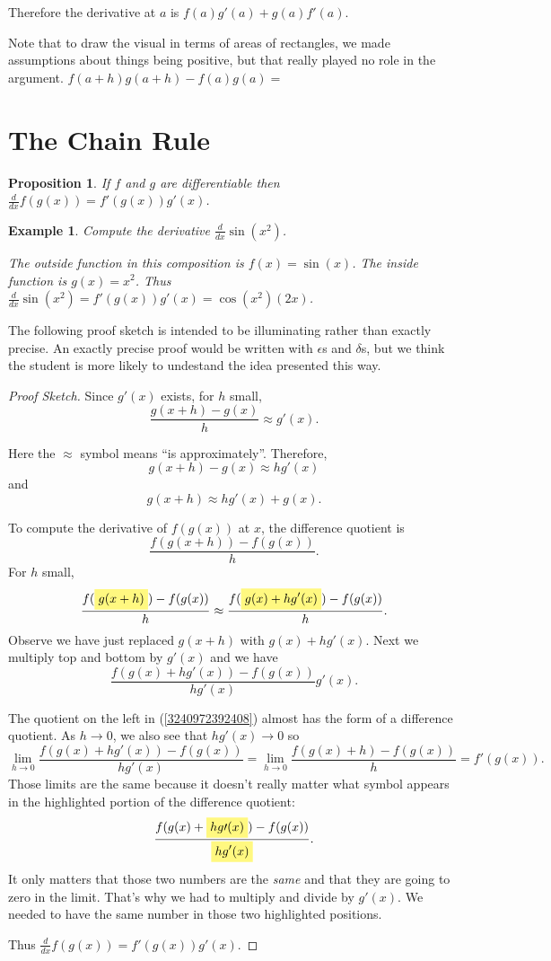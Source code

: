 \documentclass[11pt]{book}
\newcommand{\highlight}[1]{%
  \colorbox{yellow!50}{$\displaystyle#1$}}
\newtheorem{prop}{Proposition}
\newtheorem{example}{Example}
\numberwithin{example}{chapter}
\begin{document}
Therefore the derivative at $a$ is $f(a)g'(a)+g(a)f'(a)$.

Note that to draw the visual in terms of areas of rectangles, we made assumptions about things being positive, but that really played no role in the argument.  $f(a+h)g(a+h)-f(a)g(a) = $

\section{The Chain Rule}


\begin{prop}
If $f$ and $g$ are differentiable then $\frac{d}{dx}f(g(x)) = f'(g(x))g'(x)$.
\end{prop}

\begin{example}

Compute the derivative $\frac{d}{dx}\sin(x^2)$.

The outside function in this composition is $f(x)=\sin(x)$.  The inside function is $g(x)=x^2$.  Thus $\frac{d}{dx}\sin(x^2) = f'(g(x))g'(x)= \cos(x^2)(2x)$.

\end{example}

The following proof sketch is intended to be illuminating rather than exactly precise.  An exactly precise proof would be written with $\epsilon$s and $\delta$s, but we think the student is more likely to undestand the idea presented this way.

\begin{proof}[Proof Sketch]

Since $g'(x)$ exists, for $h$ small, 
$$\frac{g(x+h)-g(x)}{h}\approx g'(x).$$

Here the $\approx$ symbol means ``is approximately''.  Therefore, 
$$g(x+h)-g(x)\approx hg'(x)$$
and 
$$g(x+h)\approx hg'(x)+g(x).$$

To compute the derivative of $f(g(x))$ at $x$, the difference quotient is $$\frac{f(g(x+h))-f(g(x))}{h}.$$
For $h$ small, 
$$ 
\frac{f(\highlight{g(x+h)})-f(g(x))}{h} \approx \frac{f(\highlight{g(x) + hg'(x)})-f(g(x))}{h}.$$
Observe we have just replaced $g(x+h)$ with $g(x) + hg'(x)$.  Next we multiply top and bottom by $g'(x)$ and we have 
\begin{equation} \label{3240972392408}
\frac{f(g(x) + hg'(x))-f(g(x))}{hg'(x)} g'(x).
\end{equation}

The quotient on the left in  (\ref{3240972392408}) almost has the form of a difference quotient.  As $h\to 0$, we also see that $hg'(x)\to 0$ so 
$$\lim_{h\to 0} \frac{f(g(x) + hg'(x))-f(g(x))}{hg'(x)}  = \lim_{h\to 0} \frac{f(g(x) + h)-f(g(x))}{h} = f'(g(x)).$$
Those limits are the same because it doesn't really matter what symbol appears in the highlighted portion of the difference quotient: 
$$\frac{f(g(x) + \highlight{hg\prime(x)})-f(g(x))}{\highlight{hg'(x)}}.$$
It only matters that those two numbers are the \emph{same} and that they are going to zero in the limit.  That's why we had to multiply and divide by $g'(x)$.  We needed to have the same number in those two highlighted positions.  

Thus $\frac{d}{dx}f(g(x)) = f'(g(x))g'(x)$.
\end{proof}
\end{document}
